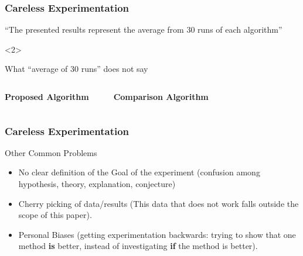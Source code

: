 \documentclass{beamer}
\begin{document}
\begin{frame}
  \frametitle{Careless Experimentation}

  \begin{block}{}
    ``The presented results represent the average from 30 runs of each
    algorithm''
  \end{block}

  \begin{onlyenv}<2>
  \begin{block}{What ``average of 30 runs'' does not say}
    \begin{columns}[c]
      {\bf Proposed Algorithm}
      \medskip

      \begin{itemize}
      \end{itemize}
      {\bf Comparison Algorithm}
      \medskip

      \begin{itemize}
      \end{itemize}
    \end{columns}
  \end{block}
  \end{onlyenv}
\end{frame}

\begin{frame}
  \frametitle{Careless Experimentation}
  \begin{block}{Other Common Problems}
    \begin{itemize}
    \item No clear definition of the Goal of the experiment (confusion
      among hypothesis, theory, explanation, conjecture)
      \smallskip

    \item Cherry picking of data/results (This data that does not work
      falls outside the scope of this paper).
      \smallskip

    \item Personal Biases (getting experimentation backwards: trying
      to show that one method {\bf is} better, instead of
      investigating {\bf if} the method is better).
    \end{itemize}
  \end{block}
\end{frame}
\end{document}

